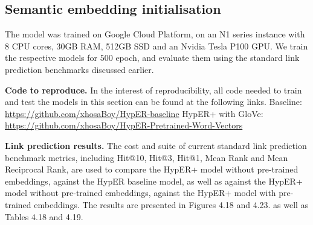 
\subsection{Semantic embedding initialisation}

\noindent The model was trained on Google Cloud Platform, on an N1 series instance with  8 CPU cores, 30GB RAM, 512GB SSD and an Nvidia Tesla P100 GPU. We train the respective models for $ 500 $ epoch, and evaluate them using the standard link prediction benchmarks discussed earlier. \par 

\noindent \textbf{Code to reproduce.} In the interest of reproducibility, all code needed to train and test the models in this section can be found at the following links. \newline
Baseline: \url{https://github.com/xhosaBoy/HypER-baseline} \newline
HypER+ with GloVe: \url{https://github.com/xhosaBoy/HypER-Pretrained-Word-Vectors} \par

\noindent \textbf{Link prediction results.} The cost and suite of current standard link prediction benchmark metrics, including Hit@10, Hit@3, Hit@1, Mean Rank and Mean Reciprocal Rank, are used to compare the HypER+ model without pre-trained embeddings, against the HypER baseline model, as well as against the HypER+ model without pre-trained embeddings, against the HypER+ model with pre-trained embeddings. The results are presented in Figures 4.18 and 4.23. as well as Tables 4.18 and 4.19. \par


\bigskip

